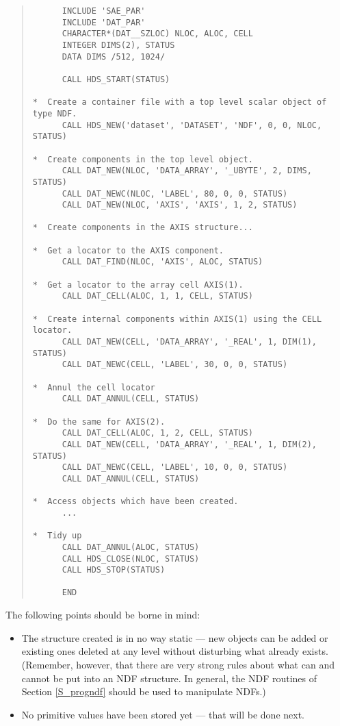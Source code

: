 \begin{quote}

\begin{small}
\begin{verbatim}
      INCLUDE 'SAE_PAR'
      INCLUDE 'DAT_PAR'
      CHARACTER*(DAT__SZLOC) NLOC, ALOC, CELL
      INTEGER DIMS(2), STATUS
      DATA DIMS /512, 1024/

      CALL HDS_START(STATUS)

*  Create a container file with a top level scalar object of type NDF.
      CALL HDS_NEW('dataset', 'DATASET', 'NDF', 0, 0, NLOC, STATUS)

*  Create components in the top level object.
      CALL DAT_NEW(NLOC, 'DATA_ARRAY', '_UBYTE', 2, DIMS, STATUS)
      CALL DAT_NEWC(NLOC, 'LABEL', 80, 0, 0, STATUS)
      CALL DAT_NEW(NLOC, 'AXIS', 'AXIS', 1, 2, STATUS)

*  Create components in the AXIS structure...

*  Get a locator to the AXIS component.
      CALL DAT_FIND(NLOC, 'AXIS', ALOC, STATUS)

*  Get a locator to the array cell AXIS(1).
      CALL DAT_CELL(ALOC, 1, 1, CELL, STATUS)

*  Create internal components within AXIS(1) using the CELL locator.
      CALL DAT_NEW(CELL, 'DATA_ARRAY', '_REAL', 1, DIM(1), STATUS)
      CALL DAT_NEWC(CELL, 'LABEL', 30, 0, 0, STATUS)

*  Annul the cell locator
      CALL DAT_ANNUL(CELL, STATUS)

*  Do the same for AXIS(2).
      CALL DAT_CELL(ALOC, 1, 2, CELL, STATUS)
      CALL DAT_NEW(CELL, 'DATA_ARRAY', '_REAL', 1, DIM(2), STATUS)
      CALL DAT_NEWC(CELL, 'LABEL', 10, 0, 0, STATUS)
      CALL DAT_ANNUL(CELL, STATUS)

*  Access objects which have been created.
      ...

*  Tidy up
      CALL DAT_ANNUL(ALOC, STATUS)
      CALL HDS_CLOSE(NLOC, STATUS)
      CALL HDS_STOP(STATUS)

      END
\end{verbatim}
\end{small}

\end{quote}

The following points should be borne in mind:
\begin{itemize}

\item The structure created is in no way static --- new objects can be added or
existing ones deleted at any level without disturbing what already exists.
(Remember, however, that there are very strong rules about what can and cannot
be put into an NDF structure.
In general, the NDF routines of Section \ref{S_progndf} should be used to
manipulate NDFs.)

\item No primitive values have been stored yet --- that will be done next.

\end{itemize}

